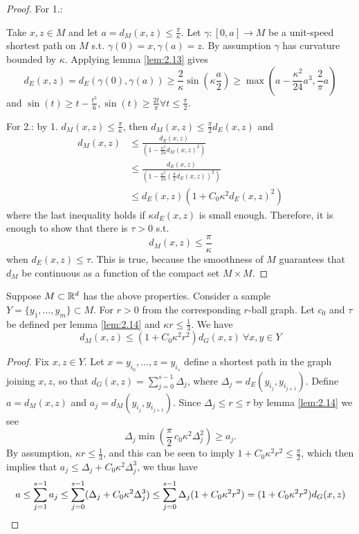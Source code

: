 \begin{proof}
    For 1.:
    
    Take $x,z\in M$ and let $a=d_M(x,z)\leq \frac{\pi}{\kappa}$. Let $\gamma:[0,a]\to M$ be a unit-speed 
    shortest path on $M$ s.t. $\gamma(0)=x,\gamma(a)=z$. By assumption $\gamma$ has curvature bounded by $\kappa$. Applying lemma \ref{lem:2.13} gives 
    \[d_E(x,z)=d_E(\gamma(0),\gamma(a))\geq \frac{2}{\kappa}\sin\left(\kappa \frac{a}{2}\right)\geq \max\left(a-\frac{\kappa^2}{24}a^3,\frac{2}{\pi}a\right)\]
    and $\sin(t)\geq t-\frac{t^3}{6},\sin(t)\geq \frac{2t}{\pi}\forall t\leq \frac{\pi}{2}$.

    For 2.: by 1. $d_M(x,z)\leq \frac{\pi}{\kappa}$, then $d_M(x,z)\leq \frac{\pi}{2}d_E(x,z)$ and 
    \begin{align*}
        d_M(x,z)&\leq \frac{d_E(x,z)}{\left(1-\frac{\kappa^2}{24}d_M(x,z)^2\right)}\\
        &\leq \frac{d_E(x,z)}{\left(1-\frac{\kappa^2}{24}\left(\frac{\pi}{2}d_E(x,z)\right)^2\right)}\\
        &\leq d_E(x,z)(1+C_0\kappa^2 d_E(x,z)^2)
    \end{align*}
    where the last inequality holds if $\kappa d_E(x,z)$ is small enough. Therefore, it is enough to show that 
    there is $\tau>0$ s.t. \[d_M(x,z)\leq \frac{\pi}{\kappa}\]
    when $d_E(x,z)\leq \tau$. This is true, because the smoothness of $M$ guarantees that $d_M$  
    be continuous as a function  of the compact set $M\times M$.
\end{proof}
\begin{theorem}\label{thm:2.15}
    Suppose $M\subset\mathbb{R}^d$ has the above properties. Consider a sample $Y=\{y_1,\dots,y_m\}\subset M$. For $r>0$ from 
    the corresponding $r$-ball graph. Let $c_0$ and $\tau$ be defined per lemma \ref{lem:2.14} and $\kappa r\leq \frac{1}{3}$. We have 
    \[d_M(x,z)\leq (1+C_0\kappa^2r^2)d_G(x,z)\ \forall x,y\in Y\]
\end{theorem}

\begin{proof}
    Fix $x,z\in Y$. Let $x=y_{i_0},\dots,z=y_{i_s}$ define a shortest path in the graph joining $x,z$, so that $d_G(x,z)=\sum_{j=0}^{s-1}\Delta_j$, where 
    $\Delta_j=d_E(y_{i_j},y_{i_{j+1}})$. Define $a=d_M(x,z)$ and $a_j=d_M(y_{i_j},y_{i_{j+1}})$. 
    Since $\Delta_j\leq r \leq \tau$ by lemma \ref{lem:2.14} we see 
    \[\Delta_j\min\left(\frac{\pi}{2}\,c_0\kappa^2 \Delta_j^2 \right)\geq a_j.\]
    By assumption, $\kappa r\leq \frac{1}{3}$, and this can be seen to imply $1+C_0\kappa^2 r^2\leq \frac{\pi}{2}$, which then implies that $a_j\leq \Delta_j+C_0\kappa^2\Delta_j^3$, we thus have 
    \[a\leq \sum_{j=1}^{s-1} a_j\leq \sum_{j=0}^{s-1}(\Delta_j + C_0\kappa^2\Delta_j^3)\leq \sum_{j=0}^{s-1}\Delta_j (1+C_0\kappa^2r^2)=(1+C_0 \kappa^2 r^2)d_G(x,z)\qedhere\]
\end{proof}

